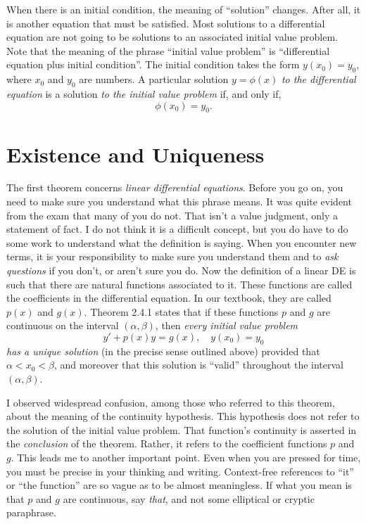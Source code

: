 \documentclass[twocolumn,12pt]{article}
\begin{document}
When there is an initial condition, the meaning of ``solution'' changes. After all, it is another equation that must be satisfied. Most solutions to a differential equation are not going to be solutions to an associated initial value problem. Note that the meaning of the phrase ``initial value problem'' is ``differential equation plus initial condition''. The initial condition takes the form $y(x_0) = y_0$, where $x_0$ and $y_0$ are numbers.
A particular solution $y = \phi(x)$ \emph{to the differential equation} is a solution \emph{to the initial value problem} if, and only if,
\[
    \phi(x_0) = y_0.
\]

\section{Existence and Uniqueness}
The first theorem concerns \emph{linear differential equations}. Before you go on, you need to make sure you understand what this phrase means. It was quite evident from the exam that many of you do not. That isn't a value judgment, only a statement of fact. I do not think it is a difficult concept, but you do have to do some work to understand what the definition is saying. When you encounter new terms, it is your responsibility to make sure you understand them and to \emph{ask questions} if you don't, or aren't sure you do. Now the definition of a linear DE is such that there are natural functions associated to it. These functions are called the coefficients in the differential equation. In our textbook, they are called $p(x)$ and $g(x)$. Theorem 2.4.1 states that if these functions $p$ and $g$ are continuous on the interval $( \alpha, \beta)$, then \emph{every initial value problem}
\[
    y' + p(x)y = g(x), \quad y(x_0) = y_0
\]
\emph{has a unique solution} (in the precise sense outlined above) provided that $\alpha < x_0 < \beta$, and moreover that this solution is ``valid'' throughout the interval $( \alpha, \beta)$. 

I observed widespread confusion, among those who referred to this theorem, about the meaning of the continuity hypothesis. This hypothesis does not refer to the solution of the initial value problem. That function's continuity is asserted in the \emph{conclusion} of the theorem. Rather, it refers to the coefficient functions $p$ and $g$. This leads me to another important point. Even when you are pressed for time, you must be precise in your thinking and writing. Context-free references to ``it'' or ``the function'' are so vague as to be almost meaningless. If what you mean is that $p$ and $g$ are continuous, say \emph{that}, and not some elliptical or cryptic paraphrase. 
\end{document}

